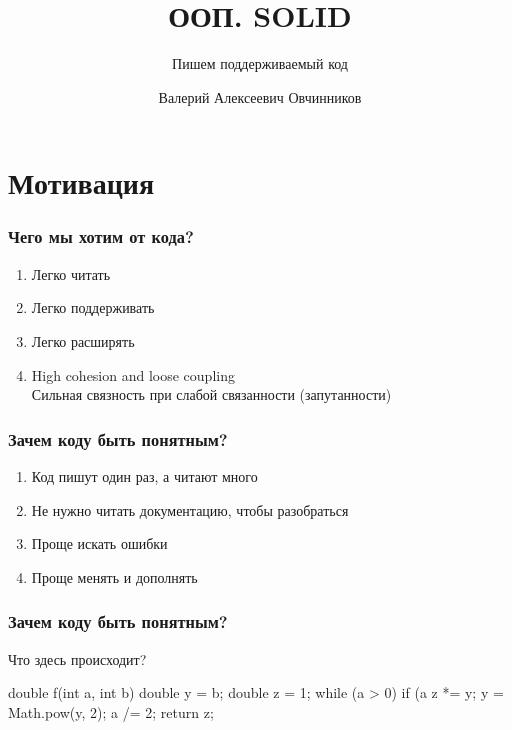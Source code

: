 \documentclass[russian,aspectratio=169,14pt]{beamer}
\title{ООП. SOLID}
\subtitle{Пишем поддерживаемый код}
\author{Валерий Алексеевич Овчинников}
\institute{valery.ovchinnikov@phystech.edu}
\begin{document}
\maketitle

\section{Мотивация}

\begin{frame}
	\frametitle{Чего мы хотим от кода?}
	\begin{enumerate}
		\item Легко читать
		\item Легко поддерживать
		\item Легко расширять
		\pause
		\item High cohesion and loose coupling\\
		Сильная связность при слабой связанности (запутанности)
	\end{enumerate}
\end{frame}

\begin{frame}
	\frametitle{Зачем коду быть понятным?}
	\begin{enumerate}
		\item Код пишут один раз, а читают много
		\pause
		\item Не нужно читать документацию, чтобы разобраться
		\pause
		\item Проще искать ошибки
		\pause
		\item Проще менять и дополнять
	\end{enumerate}
\end{frame}

\begin{frame}[fragile]
	\frametitle{Зачем коду быть понятным?}
	Что здесь происходит?
	\vfill
	\begin{listjava}
double f(int a, int b) {
	double y = b;
	double z = 1;
	while (a > 0) {
		if (a %
			z *= y;
		y = Math.pow(y, 2);
		a /= 2;
	}
	return z;
}
	\end{listjava}
\end{frame}
\end{document}
